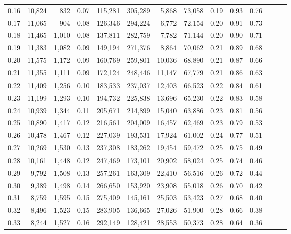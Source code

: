 \begin{tabular}{rrrrrrrrrrrrrr}
0.16 &  10,824 &    832 &  0.07 &  115,281 &  305,289 &   5,868 &  73,058 &  0.19 &  0.93 &      0.76 \\
0.17 &  11,065 &    904 &  0.08 &  126,346 &  294,224 &   6,772 &  72,154 &  0.20 &  0.91 &      0.73 \\
0.18 &  11,465 &  1,010 &  0.08 &  137,811 &  282,759 &   7,782 &  71,144 &  0.20 &  0.90 &      0.71 \\
0.19 &  11,383 &  1,082 &  0.09 &  149,194 &  271,376 &   8,864 &  70,062 &  0.21 &  0.89 &      0.68 \\
0.20 &  11,575 &  1,172 &  0.09 &  160,769 &  259,801 &  10,036 &  68,890 &  0.21 &  0.87 &      0.66 \\
0.21 &  11,355 &  1,111 &  0.09 &  172,124 &  248,446 &  11,147 &  67,779 &  0.21 &  0.86 &      0.63 \\
0.22 &  11,409 &  1,256 &  0.10 &  183,533 &  237,037 &  12,403 &  66,523 &  0.22 &  0.84 &      0.61 \\
0.23 &  11,199 &  1,293 &  0.10 &  194,732 &  225,838 &  13,696 &  65,230 &  0.22 &  0.83 &      0.58 \\
0.24 &  10,939 &  1,344 &  0.11 &  205,671 &  214,899 &  15,040 &  63,886 &  0.23 &  0.81 &      0.56 \\
0.25 &  10,890 &  1,417 &  0.12 &  216,561 &  204,009 &  16,457 &  62,469 &  0.23 &  0.79 &      0.53 \\
0.26 &  10,478 &  1,467 &  0.12 &  227,039 &  193,531 &  17,924 &  61,002 &  0.24 &  0.77 &      0.51 \\
0.27 &  10,269 &  1,530 &  0.13 &  237,308 &  183,262 &  19,454 &  59,472 &  0.25 &  0.75 &      0.49 \\
0.28 &  10,161 &  1,448 &  0.12 &  247,469 &  173,101 &  20,902 &  58,024 &  0.25 &  0.74 &      0.46 \\
0.29 &   9,792 &  1,508 &  0.13 &  257,261 &  163,309 &  22,410 &  56,516 &  0.26 &  0.72 &      0.44 \\
0.30 &   9,389 &  1,498 &  0.14 &  266,650 &  153,920 &  23,908 &  55,018 &  0.26 &  0.70 &      0.42 \\
0.31 &   8,759 &  1,595 &  0.15 &  275,409 &  145,161 &  25,503 &  53,423 &  0.27 &  0.68 &      0.40 \\
0.32 &   8,496 &  1,523 &  0.15 &  283,905 &  136,665 &  27,026 &  51,900 &  0.28 &  0.66 &      0.38 \\
0.33 &   8,244 &  1,527 &  0.16 &  292,149 &  128,421 &  28,553 &  50,373 &  0.28 &  0.64 &      0.36 \\

\end{tabular}
